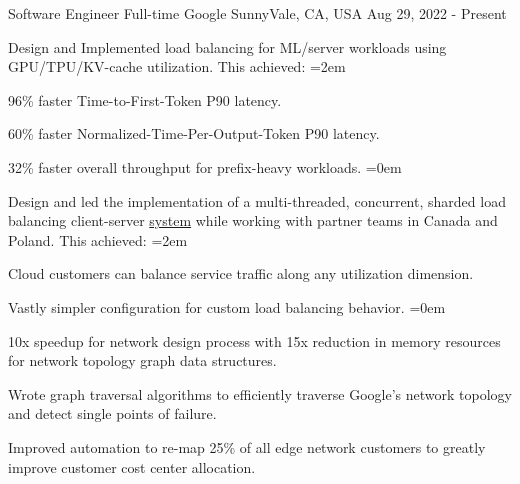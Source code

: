 
\begin{cventries}
  \cventry
    {Software Engineer Full-time} %
    {Google} %
    {SunnyVale, CA, USA} %
    {Aug 29, 2022 - Present} %
    {
      \begin{cvitems} %
        \item {Design and Implemented load balancing for ML/server workloads
          using GPU/TPU/KV-cache utilization. This achieved:}
        \itemindent=2em
          \item {96\% faster Time-to-First-Token P90 latency.}
          \item {60\% faster Normalized-Time-Per-Output-Token P90 latency.}
          \item {32\% faster overall throughput for prefix-heavy workloads.}
        \itemindent=0em
        \item {Design and led the implementation of a multi-threaded,
          concurrent, sharded load balancing client-server
          \href{https://cloud.google.com/kubernetes-engine/docs/how-to/expose-custom-metrics}{system} while working
          with partner teams in Canada and Poland. This achieved:}
        \itemindent=2em
        \item {Cloud customers can balance service traffic along any
          utilization dimension.}
        \item {Vastly simpler configuration for custom load balancing behavior.}
        \itemindent=0em
        \item {10x speedup for network design process with 15x reduction in
          memory resources for network topology graph data structures.}
        \item {Wrote graph traversal algorithms to efficiently traverse Google's
          network topology and detect single points of failure.}
        \item {Improved automation to re-map 25\% of all edge network customers
          to greatly improve customer cost center allocation.}
      \end{cvitems}
    }


\end{cventries}

